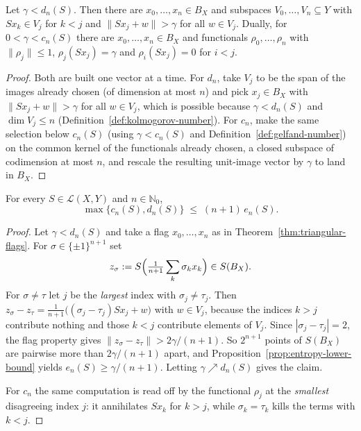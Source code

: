 \begin{theorem}
\label{thm:triangular-flags}
\leanok
{}
Let $\gamma < d_n(S)$. Then there are $x_0, \dots, x_n \in B_X$ and subspaces
$V_0, \dots, V_n \subseteq Y$ with $S x_k \in V_j$ for $k < j$ and
$\|S x_j + w\| > \gamma$ for all $w \in V_j$. Dually, for
$0 < \gamma < c_n(S)$ there are $x_0, \dots, x_n \in B_X$ and functionals
$\rho_0, \dots, \rho_n$ with $\|\rho_j\| \le 1$,
$\rho_j(S x_j) = \gamma$ and $\rho_i(S x_j) = 0$ for $i < j$.
\end{theorem}
\begin{proof}
\leanok
Both are built one vector at a time. For $d_n$, take $V_j$ to be the span of
the images already chosen (of dimension at most $n$) and pick
$x_j \in B_X$ with $\|S x_j + w\| > \gamma$ for all $w \in V_j$, which is
possible because $\gamma < d_n(S)$ and $\dim V_j \le n$
(Definition~\ref{def:kolmogorov-number}). For $c_n$, make the same selection
below $c_n(S)$ (using $\gamma < c_n(S)$ and
Definition~\ref{def:gelfand-number}) on the common kernel of the
functionals already chosen, a closed subspace of codimension at most $n$, and
rescale the resulting unit-image vector by $\gamma$ to land in $B_X$.
\end{proof}

\begin{theorem}
\label{thm:gelfand-kolmogorov-le-entropy}
\leanok
{}
For every $S \in \mathcal{L}(X, Y)$ and $n \in \mathbb{N}_0$,
\[
  \max \bigl\{ c_n(S), d_n(S) \bigr\} \;\le\; (n+1)\, e_n(S) .
\]
\end{theorem}
\begin{proof}
\leanok
Let $\gamma < d_n(S)$ and take a flag $x_0, \dots, x_n$ as in
Theorem~\ref{thm:triangular-flags}. For $\sigma \in \{\pm 1\}^{n+1}$ set
\[
  z_\sigma := S \Bigl( \tfrac{1}{n+1} \sum_k \sigma_k x_k \Bigr) \in S(B_X) .
\]
For $\sigma \neq \tau$ let $j$ be the \emph{largest} index with
$\sigma_j \neq \tau_j$. Then
$z_\sigma - z_\tau = \tfrac{1}{n+1}\bigl( (\sigma_j - \tau_j) S x_j + w
\bigr)$ with $w \in V_j$, because the indices $k > j$ contribute nothing and
those $k < j$ contribute elements of $V_j$. Since $|\sigma_j - \tau_j| = 2$,
the flag property gives $\|z_\sigma - z_\tau\| > 2\gamma/(n+1)$. So
$2^{n+1}$ points of $S(B_X)$ are pairwise more than $2\gamma/(n+1)$ apart,
and Proposition~\ref{prop:entropy-lower-bound} yields
$e_n(S) \ge \gamma/(n+1)$. Letting $\gamma \nearrow d_n(S)$ gives the claim.

For $c_n$ the same computation is read off by the functional $\rho_j$ at the
\emph{smallest} disagreeing index $j$: it annihilates $S x_k$ for $k > j$,
while $\sigma_k = \tau_k$ kills the terms with $k < j$.
\end{proof}

